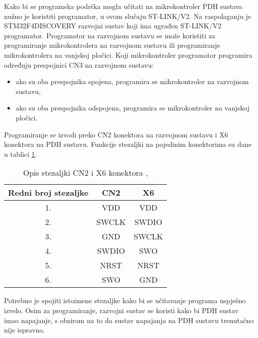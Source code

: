 Kako bi se programska podrška mogla učitati na mikrokontroler PDH sustava nužno je koristiti programator, u ovom slučaju ST-LINK/V2. Na raspolaganju je STM32F4DISCOVERY razvojni sustav koji ima ugrađen ST-LINK/V2 programator. Programator na razvojnom sustavu se može koristiti za programiranje mikrokontrolera na razvojnom sustavu ili programiranje mikrokontrolera na vanjskoj pločici. Koji mikrokontroler programator programira određuju prespojnici CN3 na razvojnom sustavu:
\begin{itemize}
	\item ako su oba prespojnika spojena, programira se mikrokontroler na razvojnom sustavu,
	\item ako su oba prespojnika odspojena, programira se mikrokontroler na vanjskoj pločici.
\end{itemize}
Programiranje se izvodi preko CN2 konektora na razvojnom sustavu i X6 konektora na PDH sustavu. Funkcije stezaljki na pojedinim konektorima su dane u tablici \ref{Tab:conn_func}.
\begin{center}
	\begin{table}[H]
		\centering
		\caption{Opis stezaljki CN2 i X6 konektora \cite{zavrsni_filip_juric}, \cite{disc_manual}}
		\begin{tabular}{| c | c | c |}
			\hline
			Redni broj stezaljke & CN2 & X6 \\
			\hline
			1. & VDD & VDD \\
			\hline
			2. & SWCLK & SWDIO \\
			\hline
			3. & GND & SWCLK \\
			\hline
			4. & SWDIO & SWO \\
			\hline
			5. & NRST & NRST \\
			\hline
			6. & SWO & GND \\
			\hline
		\end{tabular}
		\label{Tab:conn_func}
	\end{table}
\end{center}
Potrebno je spojiti istoimene stezaljke kako bi se učitavanje programa uspješno izvelo. Osim za programiranje, razvojni sustav se koristi kako bi PDH sustav imao napajanje, s obzirom na to da sustav napajanja na PDH sustavu trenutačno nije ispravno.